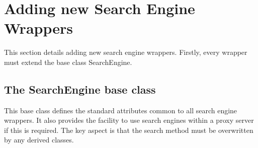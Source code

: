 \documentclass[letterpaper,10pt,english]{sphinxmanual}
\begin{document}
\section{Adding new Search Engine Wrappers}
\label{extendingSearchEngine:extending-the-search-engine}\label{extendingSearchEngine::doc}\label{extendingSearchEngine:adding-new-search-engine-wrappers}
This section details adding new search engine wrappers. Firstly, every wrapper must extend the base class SearchEngine.


\subsection{The SearchEngine base class}
\label{extendingSearchEngine:the-searchengine-base-class}
This base class defines the standard attributes common to all search engine wrappers. It also provides the facility to use search engines within a proxy server if this is required. The key aspect is that the search method must be overwritten by any derived classes.
\end{document}
